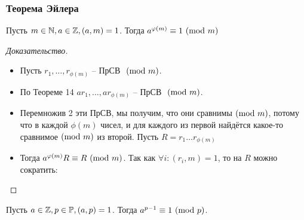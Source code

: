 \begin{frame}[t]
    \frametitle{\bf \normalsize Теорема Эйлера}
    \small
    \setcounter{theorem}{14}
    \begin{theorem}[Эйлера]
        Пусть $m \in \mathbb{N}, a \in \mathbb{Z}, (a,m)=1$. Тогда $a^{\varphi(m)} \equiv 1 \ (\mathrm{mod}\ m)$
    \end{theorem}
    
    \begin{proof}[Доказательство]
        \begin{itemize}
            \item Пусть $r_1, \dots, r_{\phi(m)}$ -- ПрСВ $\ (\mathrm{mod}\ m)$.
            \item По Теореме 14 $ar_1, \dots, ar_{\phi(m)}$ -- ПрСВ $\ (\mathrm{mod}\ m)$.
            \item Перемножив 2 эти ПрСВ, мы получим, что они сравнимы$\ (\mathrm{mod}\ m)$, потому что в каждой $\phi(m)$ чисел, и для каждого из первой найдётся какое-то сравнимое$\ (\mathrm{mod}\ m)$ из второй. Пусть  $R = r_1 \dots r_{\phi(m)}$ 
            \item Тогда $a^{\varphi(m)}R \equiv R \ (\mathrm{mod}\ m)$. Так как $\forall i: (r_i, m) = 1 $, то на $R$ можно сократить: 
        \end{itemize}
    \end{proof}
    \vspace{-0.7cm}
    \begin{corollary}
        Пусть $a \in \mathbb{Z}, p \in \mathbb{P}, (a, p) = 1$. Тогда $a^{p-1} \equiv 1 \ (\mathrm{mod}\ p)$.
    \end{corollary}
\end{frame}




